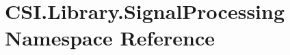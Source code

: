 \hypertarget{namespace_c_s_i_1_1_library_1_1_signal_processing}{}\section{C\+S\+I.\+Library.\+Signal\+Processing Namespace Reference}
\label{namespace_c_s_i_1_1_library_1_1_signal_processing}
